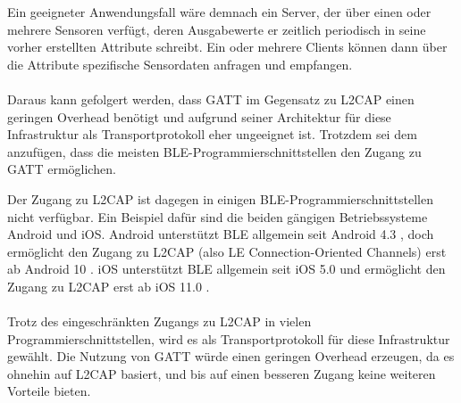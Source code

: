 Ein geeigneter Anwendungsfall wäre demnach ein Server, der über einen oder mehrere Sensoren verfügt, deren Ausgabewerte er zeitlich periodisch in seine vorher erstellten Attribute schreibt. Ein oder mehrere Clients können dann über die Attribute spezifische Sensordaten anfragen und empfangen.
\\\\
Daraus kann gefolgert werden, dass GATT im Gegensatz zu L2CAP einen geringen Overhead benötigt und aufgrund seiner Architektur für diese Infrastruktur als Transportprotokoll eher ungeeignet ist. Trotzdem sei dem anzufügen, dass die meisten BLE-Programmierschnittstellen den Zugang zu GATT ermöglichen.

Der Zugang zu L2CAP ist dagegen in einigen BLE-Programmierschnittstellen nicht verfügbar. Ein Beispiel dafür sind die beiden gängigen Betriebssysteme Android und iOS. Android unterstützt BLE allgemein seit Android 4.3 \cite{AndroidAppLayerSec}, doch ermöglicht den Zugang zu L2CAP (also LE Connection-Oriented Channels) erst ab Android 10 \cite{AndroidCoC}. iOS unterstützt BLE allgemein seit iOS 5.0 \cite{iOS_coreBluetooth} und ermöglicht den Zugang zu L2CAP erst ab iOS 11.0 \cite{iOS_CBL2CAPChannel}.
\\\\
Trotz des eingeschränkten Zugangs zu L2CAP in vielen Programmierschnittstellen, wird es als Transportprotokoll für diese Infrastruktur gewählt. Die Nutzung von GATT würde einen geringen Overhead erzeugen, da es ohnehin auf L2CAP basiert, und bis auf einen besseren Zugang keine weiteren Vorteile bieten.